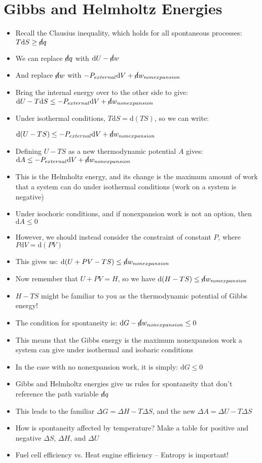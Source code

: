 \documentclass[12pt, openany, letterpaper]{memoir}
\begin{document}
\section*{Gibbs and Helmholtz Energies}
\begin{itemize}
	\item Recall the Clausius inequality, which holds for all spontaneous processes: $T\mathrm{d}S\geq\cancel{\mathrm{d}}q$
	\item We can replace $\cancel{\mathrm{d}}q$ with $\mathrm{d}U - \cancel{\mathrm{d}}w$
	\item And replace $\cancel{\mathrm{d}}w$ with $-P_{external}\mathrm{d}V + \cancel{\mathrm{d}}w_{nonexpansion}$
	\item Bring the internal energy over to the other side to give: $\mathrm{d}U - T\mathrm{d}S \leq -P_{external}\mathrm{d}V + \cancel{\mathrm{d}}w_{nonexpansion}$
	\item Under isothermal conditions, $T\mathrm{d}S = \mathrm{d}(TS)$, so we can write:
	
	$\mathrm{d}(U-TS) \leq -P_{external}\mathrm{d}V + \cancel{\mathrm{d}}w_{nonexpansion}$	
	\item Defining $U-TS$ as a new thermodynamic potential $A$ gives: $\mathrm{d}A\leq-P_{external}\mathrm{d}V + \cancel{\mathrm{d}}w_{nonexpansion}$
	\item This is the Helmholtz energy, and its change is the maximum amount of work that a system can do under isothermal conditions (work on a system is negative)
	\item Under isochoric conditions, and if nonexpansion work is not an option, then $\mathrm{d}A\leq 0$
	\item However, we should instead consider the constraint of constant $P$, where $P\mathrm{d}V=\mathrm{d}(PV)$
	\item This gives us: $\mathrm{d}(U+PV-TS)\leq\cancel{\mathrm{d}}w_{nonexpansion}$
	\item Now remember that $U+PV = H$, so we have $\mathrm{d}(H-TS)\leq\cancel{\mathrm{d}}w_{nonexpansion}$
	\item $H-TS$ might be familiar to you as the thermodynamic potential of Gibbs energy!
	\item The condition for spontaneity is: $\mathrm{d}G - \cancel{\mathrm{d}}w_{nonexpansion}\leq0$
	\item This means that the Gibbs energy is the maximum nonexpansion work a system can give under isothermal and isobaric conditions
	\item In the case with no nonexpansion work, it is simply: $\mathrm{d}G\leq0$
	\item Gibbs and Helmholtz energies give us rules for spontaneity that don't reference the path variable $\cancel{\mathrm{d}}q$
	\item This leads to the familiar $\Delta G = \Delta H - T\Delta S$, and the new $\Delta A = \Delta U - T\Delta S$
	\item How is spontaneity affected by temperature? Make a table for positive and negative $\Delta S$, $\Delta H$, and $\Delta U$
	\item Fuel cell efficiency vs. Heat engine efficiency -- Entropy is important!
\end{itemize}
\end{document}
